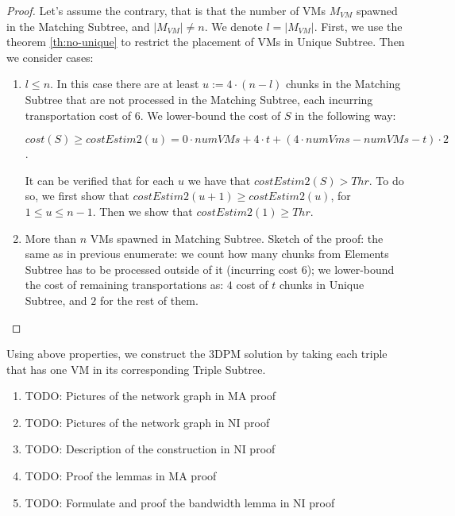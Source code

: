 \begin{proof}
  Let's assume the contrary, that is that the number of VMs $M_{VM}$ spawned in
  the Matching Subtree, and $|M_{VM}| \neq n$. We denote
  $l=|M_{VM}|$. First, we use the theorem
  \ref{th:no-unique} to restrict the placement of VMs in Unique Subtree. Then we consider cases:
  \begin{enumerate}
    \item $l \leq n$. In this case there are at least $u := 4 \cdot (n-l)$
      chunks in the Matching Subtree that are not processed in the
      Matching Subtree, each incurring transportation cost of $6$. We
      lower-bound the cost of $S$ in the following way:

$cost(S) \geq costEstim2(u) = 0\cdot numVMs + 4\cdot t + (4\cdot
numVms - numVMs - t)\cdot 2$. 

It can be verified that for each $u$ we have that $costEstim2(S) > Thr$. To
do so, we first show that $costEstim2(u+1) \geq costEstim2(u)$, for
$1\leq u \leq n-1$. Then we show that $costEstim2(1) \geq Thr$.

    \item More than $n$ VMs spawned in Matching Subtree. Sketch of the
      proof: the same as in previous enumerate: we count how many
      chunks from Elements Subtree has to be processed outside of it
      (incurring cost $6$);
      we lower-bound the cost of remaining transportations as: $4$
      cost of $t$ chunks in Unique Subtree, and $2$ for the rest of them.
  \end{enumerate}
\end{proof}

Using above properties, we construct the 3DPM solution by taking each
triple that has one VM in its corresponding Triple Subtree.

\begin{enumerate}
\item TODO: Pictures of the network graph in MA proof
\item TODO: Pictures of the network graph in NI proof
\item TODO: Description of the construction in NI proof
\item TODO: Proof the lemmas in MA proof
\item TODO: Formulate and proof the bandwidth lemma in NI proof
\end{enumerate}